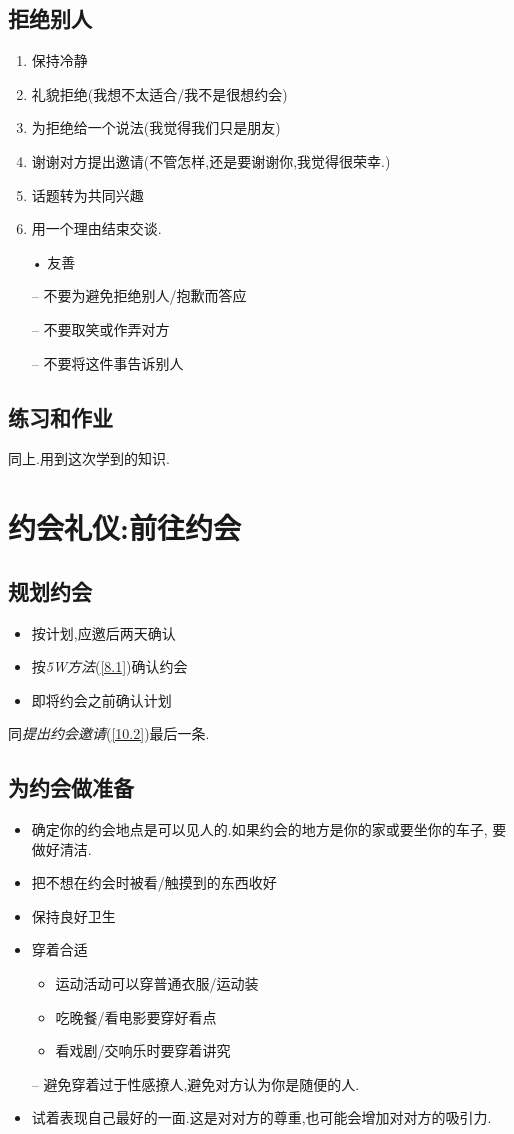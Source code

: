 \documentclass[UTF8]{article}
\newcommand{\Exer}{\subsection{练习和作业}}
\newcommand{\Dot}{•}
\newcommand{\dash}{–}
\begin{document}
\subsection{拒绝别人}
\begin{enumerate}
    \item 保持冷静
    \item 礼貌拒绝(我想不太适合/我不是很想约会)
    \item 为拒绝给一个说法(我觉得我们只是朋友)
    \item 谢谢对方提出邀请(不管怎样,还是要谢谢你,我觉得很荣幸.)
    \item 话题转为共同兴趣
    \item 用一个理由结束交谈.
    \item[\Dot] 友善
    \item[\dash] 不要为避免拒绝别人/抱歉而答应
    \item[\dash] 不要取笑或作弄对方
    \item[\dash] 不要将这件事告诉别人
\end{enumerate}
\Exer 同上.用到这次学到的知识.

\newpage
\section{约会礼仪:前往约会}

\subsection{规划约会}
\begin{itemize}
    \item 按计划,应邀后两天确认
    \item 按\emph{5W方法}(\ref{8.1})确认约会
    \item 即将约会之前确认计划
\end{itemize}
同\emph{提出约会邀请}(\ref{10.2})最后一条.

\subsection{为约会做准备}
\begin{itemize}
    \item 确定你的约会地点是可以见人的.如果约会的地方是你的家或要坐你的车子, 要做好清洁.
    \item 把不想在约会时被看/触摸到的东西收好
    \item 保持良好卫生
    \item 穿着合适\begin{itemize}[label=*]
        \item 运动活动可以穿普通衣服/运动装
        \item 吃晚餐/看电影要穿好看点
        \item 看戏剧/交响乐时要穿着讲究
    \end{itemize}
    \item[\dash] 避免穿着过于性感撩人,避免对方认为你是随便的人.
    \item 试着表现自己最好的一面.这是对对方的尊重,也可能会增加对对方的吸引力.
\end{itemize}
\end{document}
